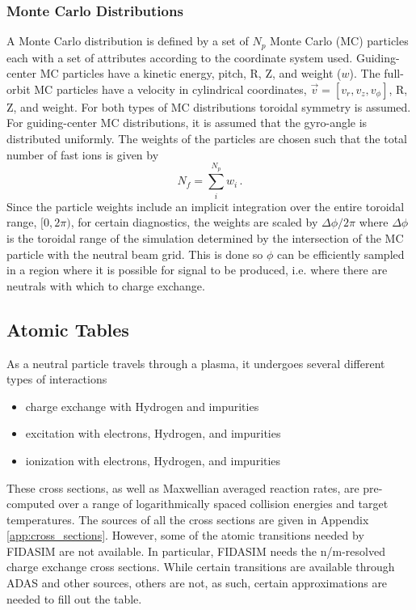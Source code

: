 \subsubsection{Monte Carlo Distributions}
A Monte Carlo distribution is defined by a set of $N_p$ Monte Carlo (MC) particles each with a set of attributes according to the coordinate system used. Guiding-center MC particles have a kinetic energy, pitch, R, Z, and weight ($w$). The full-orbit MC particles have a velocity in cylindrical coordinates, $\vec{v} = [v_r,v_z,v_\phi]$, R, Z, and weight.
For both types of MC distributions toroidal symmetry is assumed. For guiding-center MC distributions, it is assumed that the gyro-angle is distributed uniformly.
The weights of the particles are chosen such that the total number of fast ions is given by
\begin{equation}\label{eq:mc_ntot}
    N_{f} = \sum_i^{N_{p}} w_i \,.
\end{equation}
Since the particle weights include an implicit integration over the entire toroidal range, $[0,2\pi)$, for certain diagnostics, the weights are scaled by $\Delta \phi/2\pi$ where $\Delta \phi$ is the toroidal range of the simulation determined by the intersection of the MC particle with the neutral beam grid. This is done so $\phi$ can be efficiently sampled in a region where it is possible for signal to be produced, i.e. where there are neutrals with which to charge exchange.

\subsection{Atomic Tables}
As a neutral particle travels through a plasma, it undergoes several different types of interactions
\begin{itemize}
    \item charge exchange with Hydrogen and impurities
    \item excitation with electrons, Hydrogen, and impurities
    \item ionization with electrons, Hydrogen, and impurities
\end{itemize}
These cross sections, as well as Maxwellian averaged reaction rates, are pre-computed over a range of logarithmically spaced collision energies and target temperatures. The sources of all the cross sections are given in Appendix \ref{app:cross_sections}. 
However, some of the atomic transitions needed by FIDASIM are not available. In particular, FIDASIM needs the n/m-resolved charge exchange cross sections. While certain transitions are available through ADAS\cite{adas} and other sources, others are not, as such, certain approximations are needed to fill out the table.

